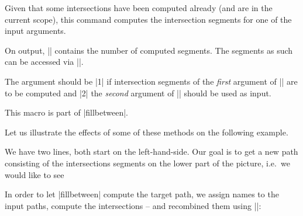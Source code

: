 \begin{command}{\pgfcomputeintersectionsegments{}}
 Given that some intersections have been computed already (and are in
 the current scope), this command computes the intersection segments
 for one of the input arguments.

 On output, |\pgfretval| contains the number of computed segments. The
 segments as such can be accessed via |\pgfgetintersectionsegmentpath|.

	The argument  should be |1| if intersection segments of the \emph{first} argument of
 |\pgfintersectionofpaths| are to be computed and |2| the \emph{second}
 argument of |\pgfintersectionofpaths| should be used as input.

	This macro is part of |fillbetween|.

	Let us illustrate the effects of some of these methods on the following example.
\begin{codeexample}[]
\end{codeexample}
	We have two lines, both start on the left-hand-side. Our goal is to get a new path consisting of the intersections segments on the lower part of the picture, i.e.\ we would like to see
\begin{codeexample}[]
\end{codeexample}
	
	In order to let |fillbetween| compute the target path, we assign names to the input paths, compute the intersections -- and recombined them using |\pgfcomputeintersectionsegments|:

\begin{codeexample}[vbox]
\end{codeexample}
\end{command}
